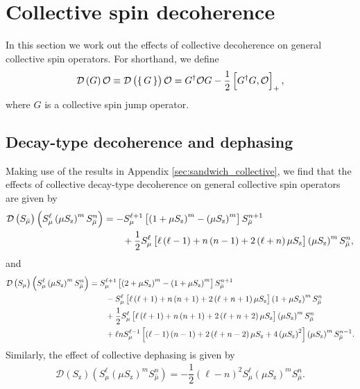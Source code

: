 \documentclass[aps,pra,twocolumn,longbibliography]{revtex4-2}
\newcommand{\f}[2]{\dfrac{#1}{#2}} %
\newcommand{\p}[1]{\left( #1 \right)} %
\renewcommand{\sp}[1]{\left[ #1 \right]} %
\newcommand{\D}{\mathcal{D}}
\renewcommand{\O}{\mathcal{O}}
\newcommand{\z}{\text{z}}
\newcommand{\bmu}{{\bar\mu}}
\newcommand{\1}{\mathds{1}}
\begin{document}
\section{Collective spin decoherence}
\label{sec:decoherence_collective}

In this section we work out the effects of collective decoherence on
general collective spin operators.  For shorthand, we define
\begin{align}
  \D\p{G} \O
  \equiv \D\p{\set{G}} \O
  = G^\dag \O G - \f12\sp{G^\dag G, \O}_+,
\end{align}
where $G$ is a collective spin jump operator.

\subsection{Decay-type decoherence and dephasing}
\label{sec:decay_dephasing_collective}

Making use of the results in Appendix \ref{sec:sandwich_collective},
we find that the effects of collective decay-type decoherence on
general collective spin operators are given by
\begin{align}
  \D\p{S_\bmu} \p{S_\mu^\ell \p{\mu S_\z}^m S_\bmu^n}
  &= -S_\mu^{\ell+1} \sp{\p{1+\mu S_\z}^m - \p{\mu S_\z}^m} S_\bmu^{n+1}
  \notag \\
  &\qquad + \f12 S_\mu^\ell \sp{\ell\p{\ell-1} + n\p{n-1}
    + 2\p{\ell+n}\mu S_\z} \p{\mu S_\z}^m S_\bmu^n,
\end{align}
and
\begin{align}
  \D\p{S_\mu} \p{S_\mu^\ell \p{\mu S_\z}^m S_\bmu^n}
  &= S_\mu^{\ell+1} \sp{\p{2+\mu S_\z}^m-\p{1+\mu S_\z}^m} S_\bmu^{n+1}
  \notag \\
  &\qquad - S_\mu^\ell
  \sp{\ell\p{\ell+1} + n\p{n+1}+2\p{\ell+n+1}\mu S_\z}
  \p{1+\mu S_\z}^m S_\bmu^n \notag \\
  &\qquad + \f12 S_\mu^\ell
  \sp{\ell\p{\ell+1} + n\p{n+1}+2\p{\ell+n+2}\mu S_\z}
  \p{\mu S_\z}^m S_\bmu^n \notag \\
  &\qquad + \ell n S_\mu^{\ell-1}
  \sp{\p{\ell-1}\p{n-1}+2\p{\ell+n-2}\mu S_\z + 4\p{\mu S_\z}^2}
  \p{\mu S_\z}^m S_\bmu^{n-1}.
\end{align}
Similarly, the effect of collective dephasing is given by
\begin{align}
  \D\p{S_\z} \p{S_\mu^\ell \p{\mu S_\z}^m S_\bmu^n}
  = -\f12 \p{\ell-n}^2 S_\mu^\ell \p{\mu S_\z}^m S_\bmu^n.
\end{align}
\end{document}
